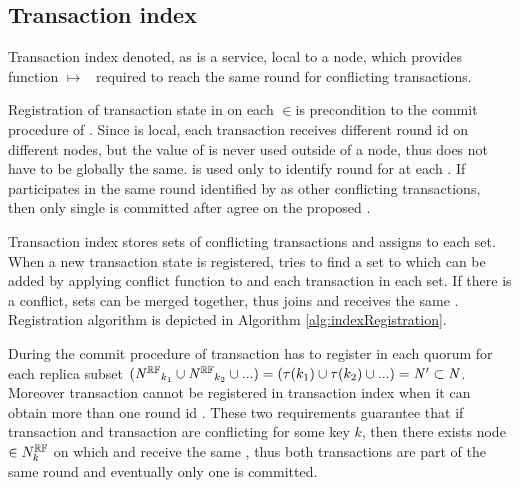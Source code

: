 
\subsection{Transaction index}
\label{sec:mpp:txIndex}
Transaction index denoted, as \txIndex is a service, local to a node, which provides function \mbox{\txState $\mapsto $ \paxosRoundId} required to reach the same \paxos round for conflicting transactions.

Registration of transaction state \txState in \txIndex on each  $\in$\nodesTx is precondition to the commit procedure of \mpt. 
Since \txIndex is local, each transaction \transaction receives different \paxos round id \paxosRoundId on different nodes, but the value of \paxosRoundId is never used outside of a node, thus \paxosRoundId does not have to be globally the same. \paxosRoundId is used only to identify \paxos round for \conflictingTxSet at each . If \transaction participates in the same \paxos round identified by \paxosRoundId as other conflicting transactions, then only single \transaction is committed after \nodesTx agree on the proposed \txState.


Transaction index stores sets of conflicting transactions \conflictingTxSet and assigns \paxosRoundId to each set. When a new transaction state \txStateM is registered, \txIndex tries to find a set \conflictingTxSet to which \txStateM can be added by applying conflict function \conflictFunction to \txStateM and each transaction \transaction in each set. If there is a conflict, sets can be merged together, thus \txStateM joins \conflictingTxSet and receives the same \paxosRoundId. Registration algorithm is depicted in Algorithm \ref{alg:indexRegistration}.

During the commit procedure of \mpt transaction \transactionFull has to register in each quorum for each replica subset
$(\mathit{N^{\mathbb{RF}}}_{k_1} \cup \mathit{N^{\mathbb{RF}}}_{k_2} \cup ... ) =
(\tau(k_1) \cup \tau(k_2) \cup ... ) = 
 \text{$\mathit{N'}$}\subset\mathit{N}$.
Moreover transaction \transaction cannot be registered in transaction index \txIndex when it can obtain more than one \paxos round id \paxosRoundId. These two requirements guarantee that if transaction \txOne and transaction \txTwo are conflicting for some key $k$, then there exists node 
$\in N^{\mathbb{RF}}_{k}$ on which \txOne and \txTwo receive the same \paxosRoundId, thus both transactions are part of the same \paxos round and eventually only one is committed.

